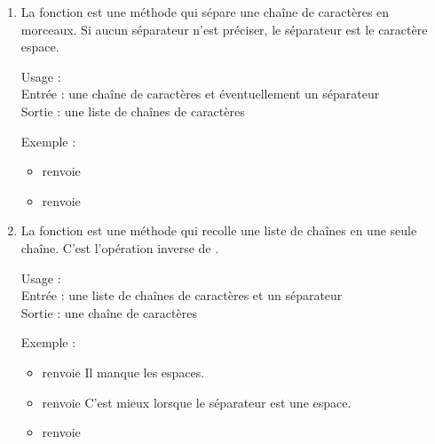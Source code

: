 \documentclass[11pt,class=report,crop=false]{standalone}
\begin{document}


\begin{cours}
\sauteligne

\begin{enumerate}
  \item  La fonction  est une méthode \Python{} qui sépare une chaîne de caractères en morceaux. Si aucun séparateur n'est préciser, le séparateur est le caractère espace.
  
  \begin{fonctionpython}
    Usage : \\
    Entrée : une chaîne de caractères  et éventuellement un séparateur   \\
    Sortie : une liste de chaînes de caractères
  
  \medskip
     
   Exemple :
  \begin{itemize}  
    \item {} renvoie 
    \item {} renvoie \ci{['12.5', '17.5', '18']}
  \end{itemize} 
  \end{fonctionpython}  
  
  \item La fonction  est une méthode \Python{} qui recolle une liste de chaînes en une seule chaîne. C'est l'opération inverse de .
  
   \begin{fonctionpython}
    Usage : \\
    Entrée : une liste de chaînes de caractères  et un séparateur   \\
    Sortie : une chaîne de caractères
  
  \medskip
     
   Exemple :
  \begin{itemize}  
    \item {} renvoie  Il manque les espaces.
    \item {} renvoie    C'est mieux lorsque le séparateur est une espace.
    \item {} renvoie   
  \end{itemize} 
  \end{fonctionpython}  


\end{enumerate}
\end{cours}
\end{document}
